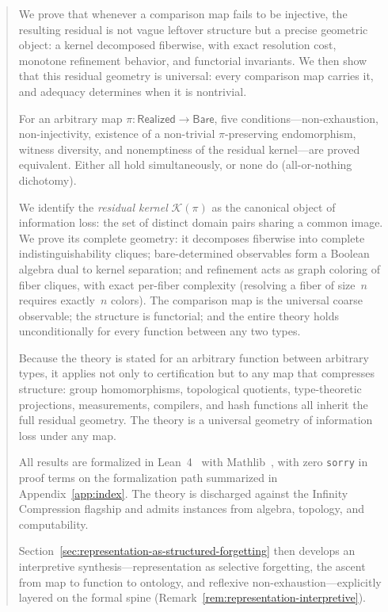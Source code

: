 \documentclass[11pt,a4paper]{article}
\theoremstyle{plain}
\theoremstyle{definition}
\theoremstyle{remark}
\newcommand{\Bare}{\mathsf{Bare}}
\newcommand{\Real}{\mathsf{Realized}}
\newcommand{\compare}{\pi}
\newcommand{\Ker}{\mathcal{K}}
\begin{document}
\begin{abstract}
\raggedright
We prove that whenever a comparison map fails to be injective, the resulting residual is not vague leftover structure but a precise geometric object: a kernel decomposed fiberwise, with exact resolution cost, monotone refinement behavior, and functorial invariants. We then show that this residual geometry is universal: every comparison map carries it, and adequacy determines when it is nontrivial.

For an arbitrary map $\compare : \Real \to \Bare$, five conditions---non-exhaustion,
non-injectivity, existence of a non-trivial $\compare$-preserving
endomorphism, witness diversity, and nonemptiness of the residual
kernel---are proved equivalent. Either all hold simultaneously, or none
do (all-or-nothing dichotomy).

We identify the \emph{residual kernel} $\Ker(\compare)$ as the canonical
object of information loss: the set of distinct domain pairs sharing a
common image. We prove its complete geometry: it decomposes
fiberwise into complete indistinguishability cliques; bare-determined
observables form a Boolean algebra dual to kernel separation; and
refinement acts as graph coloring of fiber cliques, with exact per-fiber
complexity (resolving a fiber of size~$n$ requires exactly~$n$ colors).
The comparison map is the universal coarse observable; the structure is
functorial; and the entire theory holds unconditionally for every function
between any two types.

Because the theory is stated for an arbitrary function between arbitrary
types, it applies not only to certification but to any map that compresses
structure: group homomorphisms, topological quotients, type-theoretic
projections, measurements, compilers, and hash functions all inherit the
full residual geometry. The theory is a universal geometry of information
loss under any map.

All results are formalized in Lean~4~\cite{Lean4} with Mathlib~\cite{Mathlib}, with zero
\texttt{sorry} in proof terms on the formalization path summarized in Appendix~\ref{app:index}. The theory is discharged against the
Infinity Compression flagship and admits instances from algebra, topology,
and computability.

Section~\ref{sec:representation-as-structured-forgetting} then develops an interpretive synthesis---representation as selective forgetting, the ascent from map to function to ontology, and reflexive non-exhaustion---explicitly layered on the formal spine (Remark~\ref{rem:representation-interpretive}).


\end{abstract}
\end{document}
